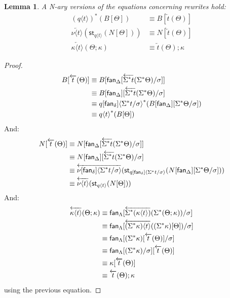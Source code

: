 \documentclass[10pt]{article}
\newtheorem{lemma}{Lemma}
\theoremstyle{definition}
\newcommand\fan[1]{\ensuremath{\mathsf{fan}_{#1}}}
\newcommand{\rewrite}[2]{\overleftarrow{#1}(#2)}
\newcommand\St[2]{\ensuremath{{#1}^*(#2)}}
\newcommand\StI[2]{\ensuremath{\mathsf{st}_{#1}(#2)}}
\newcommand\ap[2]{\ensuremath{#1 \langle #2 \rangle }}
\begin{document}
\begin{lemma}
A N-ary versions of the equations concerning rewrites hold:
\begin{align*}
\St{(\ap{q}{t})}{B[\Theta]} &\equiv B[\rewrite{t}{\Theta}] \\
\rewrite{\ap{\nu}{t}}{\StI{\ap{q}{t}}{N[\Theta]}} &\equiv N[\rewrite{t}{\Theta}] \\
\rewrite{\ap{\kappa}{t}}{\Theta;\kappa} &\equiv \rewrite{t}{\Theta};\kappa
\end{align*}
\end{lemma}
\begin{proof}
\begin{align*}
B[\rewrite{t}{\Theta}] 
&\equiv B[\fan{\Delta}[\rewrite{\ctxtuple t}{\ctxtuple \Theta}/\sigma]] \\
&\equiv B[\fan{\Delta}][\rewrite{\ctxtuple t}{\ctxtuple \Theta}/\sigma] \\
&\equiv \St{\ap{q[\fan{\delta}]}{\ctxtuple t / \sigma}}{B[\fan{\Delta}][\ctxtuple \Theta/\sigma]} \\
&\equiv \St{\ap{q}{t}}{B[\Theta]}
\end{align*}
And:
\begin{align*}
N[\rewrite{t}{\Theta}]
&\equiv N[\fan{\Delta}[\rewrite{\ctxtuple t}{\ctxtuple \Theta}/\sigma]] \\
&\equiv N[\fan{\Delta}][\rewrite{\ctxtuple t}{\ctxtuple \Theta}/\sigma] \\
&\equiv \rewrite{\ap{\nu[\fan{\delta}]}{\ctxtuple t/\sigma}}{\StI{\ap{q[\fan{\delta}]}{\ctxtuple t/\sigma}}{N[\fan{\Delta}][\ctxtuple \Theta/\sigma]}} \\
&\equiv \rewrite{\ap{\nu}{t}}{\StI{\ap{q}{t}}{N[\Theta]}} \\
\end{align*}
And:
\begin{align*}
\rewrite{\ap{\kappa}{t}}{\Theta;\kappa}
&\equiv \fan{\Lambda}[\rewrite{\ctxtuple{(\ap{\kappa}{t})}}{\ctxtuple {(\Theta;\kappa)}}/\sigma] \\
&\equiv \fan{\Lambda}[\rewrite{\ap{(\ctxtuple \kappa)}{t}}{(\ctxtuple \kappa)[\Theta]}/\sigma] \\
&\equiv \fan{\Lambda}[(\ctxtuple \kappa)[\rewrite{t}{\Theta}]/\sigma] \\
&\equiv \fan{\Lambda}[(\ctxtuple \kappa)/\sigma][\rewrite{t}{\Theta}] \\
&\equiv \kappa[\rewrite{t}{\Theta}] \\
&\equiv \rewrite{t}{\Theta};\kappa
\end{align*}
using the previous equation.
\end{proof}
\end{document}
